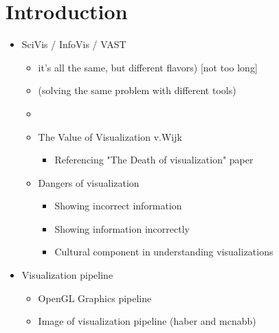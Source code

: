 \chapter{Introduction}
\label{cha:introduction}
\begin{itemize}
  \item SciVis / InfoVis / VAST
  \begin{itemize}
    \item it's all the same, but different flavors) [not too long]
    \item (solving the same problem with different tools) \item \cite{card1999readings} \cite{tory2002model}
    \item The Value of Visualization v.Wijk \cite{van2005value}
    \begin{itemize}
      \item Referencing "The Death of visualization" paper
    \end{itemize}
    \item Dangers of visualization \cite{lorensen2004death}
    \begin{itemize}
      \item Showing incorrect information
      \item Showing information incorrectly
      \item Cultural component in understanding visualizations
    \end{itemize}

  \end{itemize}
  \item Visualization pipeline
  \begin{itemize}
    \item OpenGL Graphics pipeline \cite{segal2016opengl}
    \item Image of visualization pipeline (haber and mcnabb)


\end{itemize}
\end{itemize}
